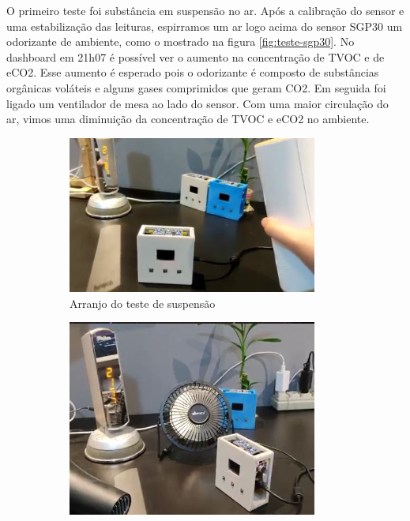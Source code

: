 \documentclass[../monografia.tex]{subfiles}
\begin{document}
O primeiro teste foi substância em suspensão no ar. Após a calibração do sensor e uma estabilização das leituras, espirramos um ar logo acima do sensor SGP30 um odorizante de ambiente, como o mostrado na figura \ref{fig:teste-sgp30}. No dashboard em 21h07 é possível ver o aumento na concentração de TVOC e de eCO2. Esse aumento é esperado pois o odorizante é composto de substâncias orgânicas voláteis e alguns gases comprimidos que geram CO2. 
Em seguida foi ligado um ventilador de mesa ao lado do sensor. Com uma maior circulação do ar, vimos uma diminuição da concentração de TVOC e eCO2 no ambiente. 

\begin{figure}[h]
\centering
	\begin{subfigure}{0.5\textwidth}
		\centering
		\includegraphics[width=0.9\textwidth]{teste-ar}
		\caption{Arranjo do teste de suspensão}
		\label{fig:glade}
	\end{subfigure}%
	\begin{subfigure}{0.5\textwidth}
		\centering
		\includegraphics[width=0.9\textwidth]{teste-ventilador}

\end{subfigure}
\end{figure}
\end{document}
